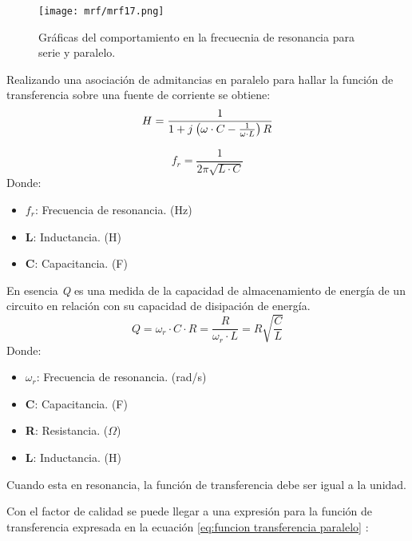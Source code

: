 \documentclass[
	12pt, %
	fleqn, %
	a4paper, %
	oneside, %
]{LegrandOrangeBook}
\begin{document}
\begin{figure}[H]
\centering
\texttt{[image: mrf/mrf17.png]}
\caption{Gráficas del comportamiento en la frecuecnia de resonancia para serie y paralelo.}
\end{figure}
\begin{definition}
Realizando una asociación de admitancias en paralelo para hallar la función de transferencia sobre una fuente de corriente se obtiene:
\begin{equation}
H=\frac{1}{1+{j\mkern1mu}\left(\omega\cdot C-\frac{1}{\omega\cdot L}\right)R}
\label{eq:funcion transferencia paralelo}
\end{equation}
\end{definition}
\begin{definition}
\begin{equation}
f_r=\frac{1}{2\pi\sqrt{L\cdot C}}
\label{eq:frec resonancia}
\end{equation}
Donde:
\begin{itemize}
\item $f_r$: Frecuencia de resonancia. (Hz)
\item \textbf{L}: Inductancia. (H)
\item \textbf{C}: Capacitancia. (F)
\end{itemize}
\end{definition}
\begin{definition}
En esencia \textit{Q} es una medida de la capacidad de almacenamiento de energía de un circuito en relación con su capacidad de disipación de energía.
\begin{equation}
Q=\omega_r\cdot C\cdot R=\frac{R}{\omega_r\cdot L}=R\sqrt{\frac{C}{L}}
\label{eq:factor calidad paralelo}
\end{equation}
Donde:
\begin{itemize}
\item $\omega_r$: Frecuencia de resonancia. (rad/s)
\item \textbf{C}: Capacitancia. (F)
\item \textbf{R}: Resistancia. ($\Omega$)
\item \textbf{L}: Inductancia. (H)
\end{itemize}
\end{definition}
\begin{remark}
Cuando esta en resonancia, la función de transferencia debe ser igual a la unidad.
\end{remark}
Con el factor de calidad se puede llegar a una expresión para la función de transferencia expresada en la ecuación \ref{eq:funcion transferencia paralelo} :
\end{document}
